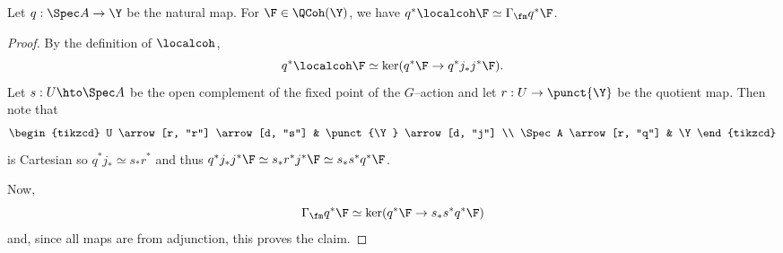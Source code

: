 \documentclass{amsart}
\begin{document}
  \begin{lem}\label{lem:underlying_loc}
    Let \(q: \Spec A \to \Y\) be the natural map. For \(\F \in \QCoh(\Y)\),
    we have \(q^\ast \localcoh \F \simeq \Gamma_{\fm} q^\ast \F \).
  \end{lem}
  \begin{proof}
    By the definition of \(\localcoh\), 
    \begin{displaymath}
      q^\ast \localcoh \F \simeq \ker(q^\ast \F \to q^\ast j_\ast j^\ast \F).
    \end{displaymath}
    Let \(s: U \hto \Spec A\) be the open complement of the
    fixed point of the \(G\)--action and let \(r: U \to \punct{\Y}\)
    be the quotient map. Then note that
    \begin{displaymath}
      \begin{tikzcd}
        U \arrow[r, "r"] \arrow[d, "s"] & \punct{\Y} \arrow[d, "j"] \\
        \Spec A \arrow[r, "q"]                          & \Y
      \end{tikzcd}
    \end{displaymath}
    is Cartesian so \(q^\ast j_\ast \simeq s_\ast r^\ast\) and thus
    \(q^\ast j_\ast j^\ast \F \simeq s_\ast r^\ast j^\ast \F \simeq s_\ast s^\ast q^\ast \F\).
    
    Now,
    \begin{displaymath}
      \Gamma_{\fm} q^\ast \F \simeq \ker(q^\ast \F \to s_\ast s^\ast q^\ast \F)
    \end{displaymath}
    and, since all maps are from adjunction, this proves the claim.
  \end{proof}
\end{document}

